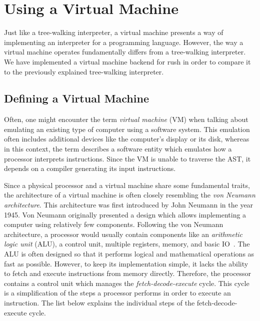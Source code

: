 \section{Using a Virtual Machine}

Just like a tree-walking interpreter, a virtual machine presents a way of implementing an interpreter for a programming language.
However, the way a virtual machine operates fundamentally differs from a tree-walking interpreter.
We have implemented a virtual machine backend for rush in order to compare it to the previously explained tree-walking interpreter.

\subsection{Defining a Virtual Machine}

Often, one might encounter the term \emph{virtual machine} (VM) when talking about emulating an existing type of computer using a software system.
This emulation often includes additional devices like the computer's display or its disk,
whereas in this context, the term describes a software entity which emulates how a processor interprets instructions.
Since the VM is unable to traverse the AST, it depends on a compiler generating its input instructions.

Since a physical processor and a virtual machine share some fundamental traits,
the architecture of a virtual machine is often closely resembling the \emph{von Neumann architecture}.
This architecture was first introduced by John Neumann in the year 1945.
Von Neumann originally presented a design which allows implementing a computer using relatively few components.
Following the von Neumann architecture, a processor would usually contain components like an \emph{arithmetic logic unit} (ALU), a control unit, multiple registers, memory, and basic IO~\cite[p.~172]{Ledin2020-yp}.
The ALU is often designed so that it performs logical and mathematical operations as fast as possible.
However, to keep its implementation simple, it lacks the ability to fetch and execute instructions from memory directly.
Therefore, the processor contains a control unit which manages the \emph{fetch-decode-execute} cycle.
This cycle is a simplification of the steps a processor performs in order to execute an instruction.
The list below explains the individual steps of the fetch-decode-execute cycle.


